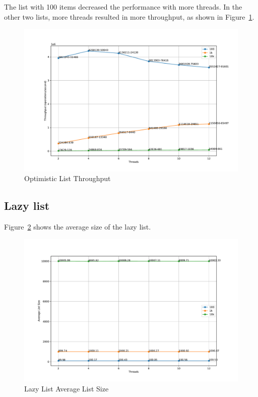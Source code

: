 \documentclass{article}
\begin{document}
The list with 100 items decreased the performance with more threads. In the other two lists, more threads resulted in more throughput, as shown in Figure~\ref{fig:optimistic-throughput}.

\begin{figure}[H]
    \centering
    \includegraphics[width=\textwidth]{../test/plots/OptimisticListThroughput.pdf}
    \caption{Optimistic List Throughput}
    \label{fig:optimistic-throughput}
\end{figure}

\subsection{Lazy list}

Figure~\ref{fig:lazy-size} shows the average size of the lazy list.

\begin{figure}[H]
    \centering
    \includegraphics[scale=0.4]{../test/plots/LazyListAverageListSize.pdf}
    \caption{Lazy List Average List Size}
    \label{fig:lazy-size}
\end{figure}
\end{document}
